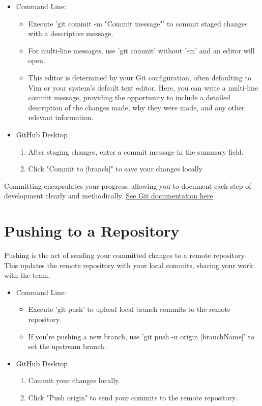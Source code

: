 \documentclass[10pt,twocolumn]{article}
\begin{document}
\begin{itemize}
    \item Command Line: 
    \begin{itemize}
        \item  Execute 'git commit -m "Commit message"' to commit staged changes with a descriptive message.
        \item For multi-line messages, use 'git commit' without '-m' and an editor will open. 
        \item This editor is determined by your Git configuration, often defaulting to Vim or your system's default text editor. Here, you can write a multi-line commit message, providing the opportunity to include a detailed description of the changes made, why they were made, and any other relevant information.
    \end{itemize}
    \item GitHub Desktop
    \begin{enumerate}
        \item After staging changes, enter a commit message in the summary field.
        \item Click "Commit to [branch]" to save your changes locally
    \end{enumerate}
    
\end{itemize}

Committing encapsulates your progress, allowing you to document each step of development clearly and methodically. \hyperlink{https://git-scm.com/docs/git-commit}{See Git documentation here}. \cite{GitCommitDocumentation}\cite{GitGuidesCommit}

\section{Pushing to a Repository}
Pushing is the act of sending your committed changes to a remote repository. This updates the remote repository with your local commits, sharing your work with the team.

\begin{itemize}
    \item Command Line: 
    \begin{itemize}
        \item  Execute 'git push' to upload local branch commits to the remote repository. 
        \item If you're pushing a new branch, use 'git push -u origin [branchName]' to set the upstream branch.
    \end{itemize}
    \item GitHub Desktop
    \begin{enumerate}
        \item Commit your changes locally.
        \item Click "Push origin" to send your commits to the remote repository.
    \end{enumerate}
    
\end{itemize}
\end{document}
